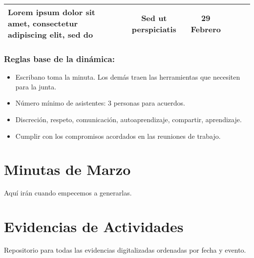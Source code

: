 \documentclass[]{book}
\providecommand{\tightlist}{%
  \setlength{\itemsep}{0pt}\setlength{\parskip}{0pt}}
\begin{document}
\begin{longtable}[]{@{}lcccll@{}}
\begin{minipage}[t]{0.27\columnwidth}
Lorem ipsum dolor sit amet, consectetur adipiscing elit, sed do\strut
\end{minipage} & \begin{minipage}[t]{0.09\columnwidth}\centering\strut
Sed ut perspiciatis\strut
\end{minipage} & \begin{minipage}[t]{0.08\columnwidth}\raggedright\strut
29 Febrero\strut
\end{minipage} & \begin{minipage}[t]{0.22\columnwidth}\raggedright\strut
\strut
\end{minipage}\tabularnewline
\bottomrule
\end{longtable}

\subsection{Reglas base de la
dinámica:}\label{reglas-base-de-la-dinamica}

\begin{itemize}
\tightlist
\item
  Escribano toma la minuta. Los demás traen las herramientas que
  necesiten para la junta.
\item
  Número mínimo de asistentes: 3 personas para acuerdos.
\item
  Discreción, respeto, comunicación, autoaprendizaje, compartir,
  aprendizaje.
\item
  Cumplir con los compromisos acordados en las reuniones de trabajo.
\end{itemize}

\chapter{Minutas de Marzo}\label{minutas-de-marzo}

Aquí irán cuando empecemos a generarlas.

\chapter{Evidencias de Actividades}\label{evidencias-de-actividades}

Repositorio para todas las evidencias digitalizadas ordenadas por fecha
y evento.


\end{document}
